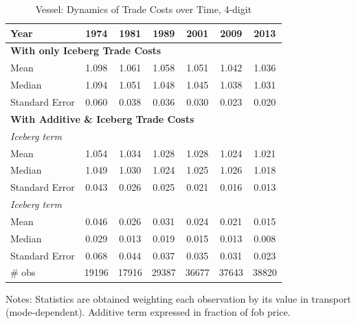 \documentclass[a4paper,11pt]{article}
\begin{document}
\begin{table}[htbp]
  \centering
\caption{Vessel: Dynamics of Trade Costs over Time, 4-digit}
\begin{center}
    \begin{tabular}{l|cccccc}
   \hline\hline
Year & 1974  & 1981  & 1989  & 2001  & 2009  & 2013 \\ 
\hline
\multicolumn{7}{l}{\textbf{With only Iceberg Trade Costs}} \\
Mean  & 1.098 & 1.061 & \multicolumn{1}{c}{1.058} & \multicolumn{1}{c}{1.051} & \multicolumn{1}{c}{1.042} & \multicolumn{1}{c}{1.036}  \\
Median & 1.094 & 1.051 & \multicolumn{1}{c}{1.048} & \multicolumn{1}{c}{1.045} & \multicolumn{1}{c}{1.038} & \multicolumn{1}{c}{1.031} \\
Standard Error & 0.060 & 0.038 & \multicolumn{1}{c}{0.036} & \multicolumn{1}{c}{0.030} & \multicolumn{1}{c}{0.023} & \multicolumn{1}{c}{0.020} \\
\hline
\multicolumn{7}{l}{\textbf{With Additive \& Iceberg Trade Costs } }\\
\textit{Iceberg term} &       &       &       &       &       &     \\
Mean  & 1.054 & 1.034 & \multicolumn{1}{c}{1.028} & \multicolumn{1}{c}{1.028} & \multicolumn{1}{c}{1.024} & \multicolumn{1}{c}{1.021}  \\
Median & 1.049 & 1.030 & \multicolumn{1}{c}{1.024} & \multicolumn{1}{c}{1.025} & \multicolumn{1}{c}{1.026} & \multicolumn{1}{c}{1.018} \\
Standard Error & 0.043 & 0.026 & \multicolumn{1}{c}{0.025} & \multicolumn{1}{c}{0.021} & \multicolumn{1}{c}{0.016} & \multicolumn{1}{c}{0.013}  \\
\textit{Iceberg term} &       &       &       &       &       &     \\
Mean  & 0.046 & 0.026 & \multicolumn{1}{c}{0.031} & \multicolumn{1}{c}{0.024} & \multicolumn{1}{c}{0.021} & \multicolumn{1}{c}{0.015}  \\
Median & 0.029 & 0.013 & \multicolumn{1}{c}{0.019} & \multicolumn{1}{c}{0.015} & \multicolumn{1}{c}{0.013} & \multicolumn{1}{c}{0.008} \\
Standard Error & 0.068 & 0.044 & \multicolumn{1}{c}{0.037} & \multicolumn{1}{c}{0.035} & \multicolumn{1}{c}{0.031} & \multicolumn{1}{c}{0.023} \\ \hline
\# obs & 19196 & 17916 & \multicolumn{1}{c}{29387} & \multicolumn{1}{c}{36677} & \multicolumn{1}{c}{37643} & \multicolumn{1}{c}{38820} \\
\hline\hline
    \end{tabular}%
  \end{center}
  \label{tab:result_ves_rob}%
\vspace{-10pt}\tiny{Notes: Statistics are obtained weighting each observation by its value in transport (mode-dependent). Additive term expressed in fraction of fob price. }
\end{table}%
\end{document}
